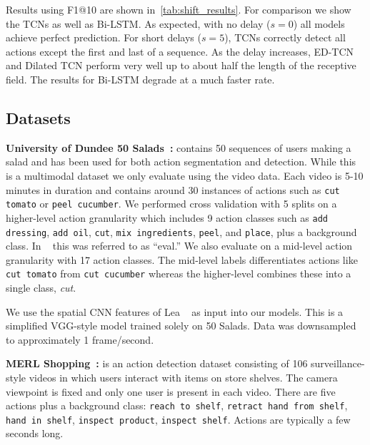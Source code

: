 \documentclass[10pt,twocolumn,letterpaper]{article}
\newcommand{\fakesubsection}[1]{\smallskip\noindent\textbf{#1:}}
\begin{document}
Results using F1@10 are shown in~\ref{tab:shift_results}. For comparison we show the TCNs as well as Bi-LSTM.
As expected, with no delay ($s=0$) all models achieve perfect prediction. For short delays ($s=5$), TCNs correctly detect all actions except the first and last of a sequence. 
As the delay increases, ED-TCN and Dilated TCN perform very well up to about half the length of the receptive field. 
The results for Bi-LSTM degrade at a much faster rate.









\subsection{Datasets}














\fakesubsection{University of Dundee 50 Salads~\cite{stein_ubicomp_2013}}
contains 50 sequences of users making a salad and has been used for both action segmentation and detection. 
While this is a multimodal dataset we only evaluate using the video data. 
Each video is 5-10 minutes in duration and contains around 30 instances of actions such as \texttt{cut tomato} or \texttt{peel cucumber}. 
We performed cross validation with 5 splits on a higher-level action granularity which includes 9 action classes such as \texttt{add dressing}, \texttt{add oil}, \texttt{cut}, \texttt{mix ingredients}, \texttt{peel}, and \texttt{place}, plus a background class. In ~\cite{stein_ubicomp_2013} this was referred to as ``eval.''
We also evaluate on a mid-level action granularity with 17 action classes. 
The mid-level labels differentiates actions like \texttt{cut tomato} from \texttt{cut cucumber} whereas the higher-level combines these into a single class, \textit{cut}. 



We use the spatial CNN features of Lea \etal~\cite{lea_eccv_2016} as input into our models. This is a simplified VGG-style model trained solely on 50 Salads. 
Data was downsampled to approximately 1 frame/second. 


\fakesubsection{MERL Shopping~\cite{singh_cvpr_2016_merl}} is an action detection dataset
consisting of 106 surveillance-style videos in which users interact with items on store shelves. The camera viewpoint is fixed and only one user is present in each video. There are five actions plus a background class: \texttt{reach to shelf},  \texttt{retract hand from shelf}, \texttt{hand in shelf}, \texttt{inspect product}, \texttt{inspect shelf}. Actions are typically a few seconds long. 
\end{document}

